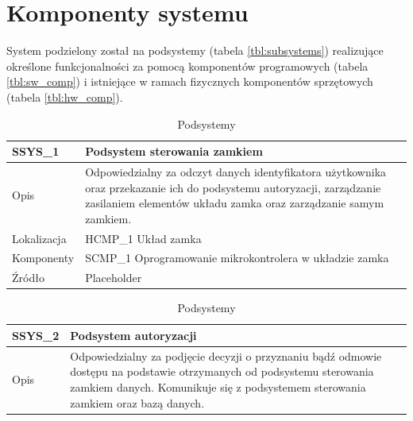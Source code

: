         \section{Komponenty systemu}

            System podzielony został na podsystemy (tabela \ref{tbl:subsystems}) realizujące określone funkcjonalności za pomocą komponentów programowych (tabela \ref{tbl:sw_comp}) i istniejące w ramach fizycznych komponentów sprzętowych (tabela \ref{tbl:hw_comp}).

                \begin{table}
                    \caption{Podsystemy}
                    \centering
                    \begin{subtable}[c]{\textwidth}
                        \centering
                        \begin{tabular}{|p{2cm}|p{12cm}|}
                            \hline SSYS\_1      & \textbf{Podsystem sterowania zamkiem} \\
                            \hline \cellcolor[gray]{0.8} Opis         & Odpowiedzialny za odczyt danych identyfikatora użytkownika oraz przekazanie ich do podsystemu autoryzacji, zarządzanie zasilaniem elementów układu zamka oraz zarządzanie samym zamkiem.  \\
                            \hline \cellcolor[gray]{0.8} Lokalizacja  & HCMP\_1 Układ zamka    \\
                            \hline \cellcolor[gray]{0.8} Komponenty   & SCMP\_1 Oprogramowanie mikrokontrolera w układzie zamka    \\
                            \hline \cellcolor[gray]{0.8} Źródło       & Placeholder    \\
                            \hline
                        \end{tabular}
                        \label{tbl:scmp1}
                        \vspace{10mm}           
                    \end{subtable}
                \quad%
                    \begin{subtable}[c]{\textwidth}
                        \centering
                        \begin{tabular}{|p{2cm}|p{12cm}|}
                            \hline SSYS\_2      & \textbf{Podsystem autoryzacji} \\
                            \hline \cellcolor[gray]{0.8} Opis         & Odpowiedzialny za podjęcie decyzji o przyznaniu bądź odmowie dostępu na podstawie otrzymanych od podsystemu sterowania zamkiem danych. Komunikuje się z podsystemem sterowania zamkiem oraz bazą danych. \\

\end{tabular}
\end{subtable}
\end{table}
